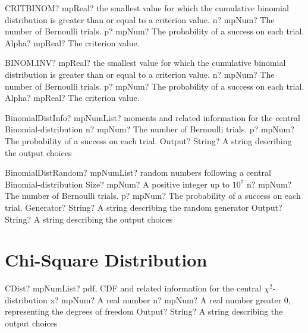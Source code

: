 \documentclass[12pt,a4paper,openany]{book}
\begin{document}
\begin{mpFunctionsExtract}
\mpWorksheetFunctionThreeNotImplemented
{CRITBINOM? mpReal? the smallest value for which the cumulative binomial distribution is greater than or equal to a criterion value.}
{n? mpNum? The number of Bernoulli trials.}
{p? mpNum? The probability of a success on each trial.}
{Alpha? mpReal? The criterion value.}
\end{mpFunctionsExtract}

\begin{mpFunctionsExtract}
\mpWorksheetFunctionThreeNotImplemented
{BINOM.INV? mpReal? the smallest value for which the cumulative binomial distribution is greater than or equal to a criterion value.}
{n? mpNum? The number of Bernoulli trials.}
{p? mpNum? The probability of a success on each trial.}
{Alpha? mpReal? The criterion value.}
\end{mpFunctionsExtract}

\begin{mpFunctionsExtract}
\mpFunctionThreeNotImplemented
{BinomialDistInfo? mpNumList? moments and related information for the central Binomial-distribution}
{n? mpNum? The number of Bernoulli trials.}
{p? mpNum? The probability of a success on each trial.}
{Output? String? A string describing the output choices}
\end{mpFunctionsExtract}

\begin{mpFunctionsExtract}
\mpFunctionFiveNotImplemented
{BinomialDistRandom? mpNumList? random numbers following a central Binomial-distribution}
{Size? mpNum? A positive integer up to $10^7$}
{n? mpNum? The number of Bernoulli trials.}
{p? mpNum? The probability of a success on each trial.}
{Generator? String? A string describing the random generator}
{Output? String? A string describing the output choices}
\end{mpFunctionsExtract}

\section{Chi-Square Distribution}

\begin{mpFunctionsExtract}
\mpFunctionThreeNotImplemented
{CDist? mpNumList? pdf, CDF and related information for the central $\chi^2$-distribution}
{x? mpNum? A real number}
{n? mpNum? A real number greater 0, representing the degrees of freedom}
{Output? String? A string describing the output choices}
\end{mpFunctionsExtract}
\end{document}
